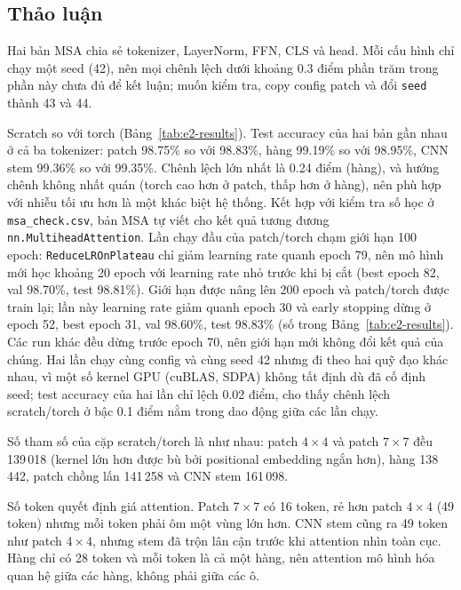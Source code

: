 \subsection{Thảo luận}
Hai bản MSA chia sẻ tokenizer, LayerNorm, FFN, CLS và head. Mỗi cấu hình chỉ chạy một seed (42), nên mọi chênh lệch dưới khoảng \(0.3\) điểm phần trăm trong phần này chưa đủ để kết luận; muốn kiểm tra, copy config patch và đổi \texttt{seed} thành 43 và 44.

Scratch so với torch (Bảng~\ref{tab:e2-results}). Test accuracy của hai bản gần nhau ở cả ba tokenizer: patch 98.75\% so với 98.83\%, hàng 99.19\% so với 98.95\%, CNN stem 99.36\% so với 99.35\%. Chênh lệch lớn nhất là 0.24 điểm (hàng), và hướng chênh không nhất quán (torch cao hơn ở patch, thấp hơn ở hàng), nên phù hợp với nhiễu tối ưu hơn là một khác biệt hệ thống. Kết hợp với kiểm tra số học ở \texttt{msa\_check.csv}, bản MSA tự viết cho kết quả tương đương \texttt{nn.MultiheadAttention}.
Lần chạy đầu của patch/torch chạm giới hạn 100 epoch: \texttt{ReduceLROnPlateau} chỉ giảm learning rate quanh epoch 79, nên mô hình mới học khoảng 20 epoch với learning rate nhỏ trước khi bị cắt (best epoch 82, val 98.70\%, test 98.81\%). Giới hạn được nâng lên 200 epoch và patch/torch được train lại; lần này learning rate giảm quanh epoch 30 và early stopping dừng ở epoch 52, best epoch 31, val 98.60\%, test 98.83\% (số trong Bảng~\ref{tab:e2-results}). Các run khác đều dừng trước epoch 70, nên giới hạn mới không đổi kết quả của chúng. Hai lần chạy cùng config và cùng seed 42 nhưng đi theo hai quỹ đạo khác nhau, vì một số kernel GPU (cuBLAS, SDPA) không tất định dù đã cố định seed; test accuracy của hai lần chỉ lệch 0.02 điểm, cho thấy chênh lệch scratch/torch ở bậc 0.1 điểm nằm trong dao động giữa các lần chạy.

Số tham số của cặp scratch/torch là như nhau: patch \(4\times4\) và patch \(7\times7\) đều 139\,018 (kernel lớn hơn được bù bởi positional embedding ngắn hơn), hàng 138\,442, patch chồng lấn 141\,258 và CNN stem 161\,098.

Số token quyết định giá attention. Patch \(7\times7\) có 16 token, rẻ hơn patch \(4\times4\) (49 token) nhưng mỗi token phải ôm một vùng lớn hơn. CNN stem cũng ra 49 token như patch \(4\times4\), nhưng stem đã trộn lân cận trước khi attention nhìn toàn cục. Hàng chỉ có 28 token và mỗi token là cả một hàng, nên attention mô hình hóa quan hệ giữa các hàng, không phải giữa các ô.

